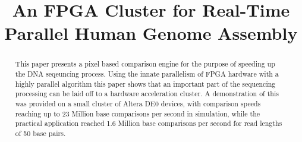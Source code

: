 \documentclass[conference]{IEEEtran}
\begin{document}
\title{An FPGA Cluster for Real-Time \\ Parallel Human Genome Assembly}


\author{
\authorblockN{----------}
\authorblockA{---------------------\\
--------------------\\
---------------------}
}




% 




\maketitle

\begin{abstract}
This paper presents a pixel based comparison engine for the purpose of speeding up the DNA seqeuncing process. Using the innate parallelism of FPGA hardware with a highly parallel algorithm this paper shows that an important part of the sequencing processing can be laid off to a hardware acceleration cluster. A demonstration of this was provided on a small cluster of Altera DE0 devices, with comparison speeds reaching up to 23 Million base comparisons per second in simulation, while the practical application reached 1.6 Million base comparisons per second for read lengths of 50 base pairs. \end{abstract}
\end{document}
